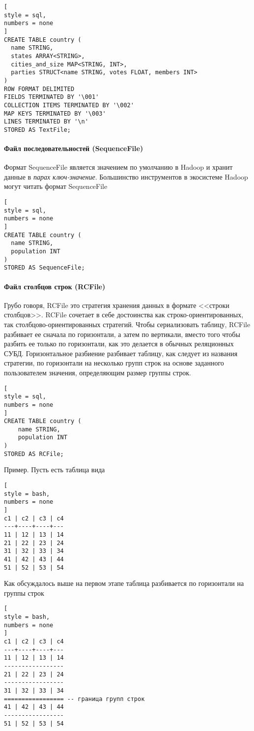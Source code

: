 \documentclass[%
	11pt,
	a4paper,
	utf8,
		]{article}
\begin{document}
\begin{lstlisting}[
style = sql,
numbers = none	
]
CREATE TABLE country (
  name STRING,
  states ARRAY<STRING>,
  cities_and_size MAP<STRING, INT>,
  parties STRUCT<name STRING, votes FLOAT, members INT>
)
ROW FORMAT DELIMITED
FIELDS TERMINATED BY '\001'
COLLECTION ITEMS TERMINATED BY '\002'
MAP KEYS TERMINATED BY '\003'
LINES TERMINATED BY '\n'
STORED AS TextFile;
\end{lstlisting}

\paragraph{Файл последовательностей (SequenceFile)} Формат SequenceFile является значением по умолчанию в Hadoop и хранит данные в \emph{парах ключ-значение}. Большинство инструментов в экосистеме Hadoop могут читать формат SequenceFile
\begin{lstlisting}[
style = sql,
numbers = none	
]
CREATE TABLE country (
  name STRING,
  population INT
)
STORED AS SequenceFile;
\end{lstlisting}

\paragraph{Файл столбцов строк (RCFile)} Грубо говоря, RCFile это стратегия хранения данных в формате <<строки столбцов>>. RCFile сочетает в себе достоинства как строко-ориентированных, так столбцово-ориентированных стратегий. Чтобы сериализовать таблицу, RCFile разбивает ее сначала по горизонтали, а затем по вертикали, вместо того чтобы разбить ее только по горизонтали, как это делается в обычных реляционных СУБД. Горизонтальное разбиение разбивает таблицу, как следует из названия стратегии, по горизонтали на несколько групп строк на основе заданного пользователем значения, определяющим размер группы строк.
\begin{lstlisting}[
style = sql,
numbers = none	
]
CREATE TABLE country (
	name STRING,
	population INT
)
STORED AS RCFile;
\end{lstlisting}

Пример. Пусть есть таблица вида
\begin{lstlisting}[
style = bash,
numbers = none	
]
c1 | c2 | c3 | c4
---+----+----+---
11 | 12 | 13 | 14
21 | 22 | 23 | 24
31 | 32 | 33 | 34
41 | 42 | 43 | 44
51 | 52 | 53 | 54
\end{lstlisting}

Как обсуждалось выше на первом этапе таблица разбивается по горизонтали на группы строк
\begin{lstlisting}[
style = bash,
numbers = none	
]
c1 | c2 | c3 | c4
---+----+----+---
11 | 12 | 13 | 14
-----------------
21 | 22 | 23 | 24
-----------------
31 | 32 | 33 | 34
================= -- граница групп строк
41 | 42 | 43 | 44
-----------------
51 | 52 | 53 | 54
\end{lstlisting}
\end{document}

